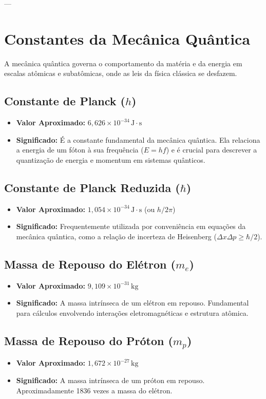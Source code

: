 \documentclass{article}
\begin{document}
---

\section{Constantes da Mecânica Quântica}
A mecânica quântica governa o comportamento da matéria e da energia em escalas atômicas e subatômicas, onde as leis da física clássica se desfazem.

\subsection{Constante de Planck ($h$)}
\begin{itemize}
    \item \textbf{Valor Aproximado:} $6,626 \times 10^{-34} \, \text{J} \cdot \text{s}$
    \item \textbf{Significado:} É a constante fundamental da mecânica quântica. Ela relaciona a energia de um fóton à sua frequência ($E = hf$) e é crucial para descrever a quantização de energia e momentum em sistemas quânticos.
\end{itemize}

\subsection{Constante de Planck Reduzida ($\hbar$)}
\begin{itemize}
    \item \textbf{Valor Aproximado:} $1,054 \times 10^{-34} \, \text{J} \cdot \text{s}$ (ou $h/2\pi$)
    \item \textbf{Significado:} Frequentemente utilizada por conveniência em equações da mecânica quântica, como a relação de incerteza de Heisenberg ($\Delta x \Delta p \ge \hbar/2$).
\end{itemize}

\subsection{Massa de Repouso do Elétron ($m_e$)}
\begin{itemize}
    \item \textbf{Valor Aproximado:} $9,109 \times 10^{-31} \, \text{kg}$
    \item \textbf{Significado:} A massa intrínseca de um elétron em repouso. Fundamental para cálculos envolvendo interações eletromagnéticas e estrutura atômica.
\end{itemize}

\subsection{Massa de Repouso do Próton ($m_p$)}
\begin{itemize}
    \item \textbf{Valor Aproximado:} $1,672 \times 10^{-27} \, \text{kg}$
    \item \textbf{Significado:} A massa intrínseca de um próton em repouso. Aproximadamente 1836 vezes a massa do elétron.
\end{itemize}
\end{document}
